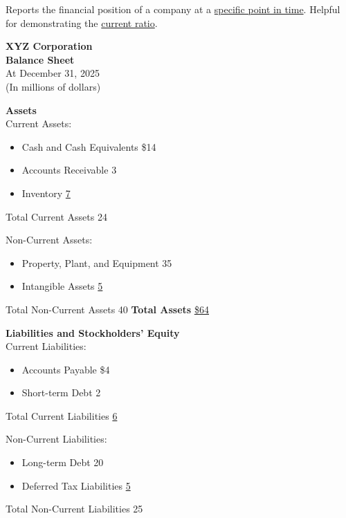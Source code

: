 Reports the financial position of a company at a \underline{specific point in time}. Helpful for demonstrating the \hyperref[def:current_ratio]{current ratio}.

\small
\begin{tcolorbox}[colframe=black,colback=white,title=Example Balance Sheet (Classified by Current \& Non-current)]
    \begin{center}
        \textbf{XYZ Corporation}\\
        \textbf{Balance Sheet}\\
        At December 31, 2025\\
        (In millions of dollars)
    \end{center}

    \begin{multicols}{2}
        \textbf{Assets}\\
        Current Assets:
        \begin{itemize}
            \item Cash and Cash Equivalents \hfill \$14
            \item Accounts Receivable \hfill 3
            \item Inventory \hfill \underline{7}
        \end{itemize}
        Total Current Assets \hfill 24

        Non-Current Assets:
        \begin{itemize}
            \item Property, Plant, and Equipment \hfill 35
            \item Intangible Assets \hfill \underline{5}
        \end{itemize}
        Total Non-Current Assets \hfill 40
        \vfill
        \textbf{Total Assets} \hfill \underline{\underline{\$64}}


        \columnbreak

        \textbf{Liabilities and Stockholders' Equity}\\
        Current Liabilities:
        \begin{itemize}
            \item Accounts Payable \hfill \$4
            \item Short-term Debt \hfill 2
        \end{itemize}
        Total Current Liabilities \hfill \underline{6}

        Non-Current Liabilities:
        \begin{itemize}
            \item Long-term Debt \hfill 20
            \item Deferred Tax Liabilities \hfill \underline{5}
        \end{itemize}
        Total Non-Current Liabilities \hfill 25


\end{multicols}
\end{tcolorbox}
